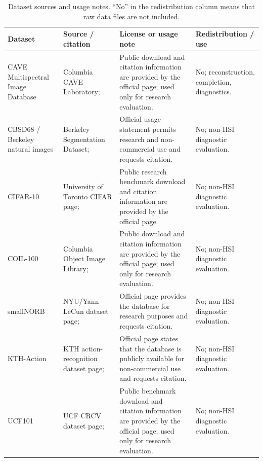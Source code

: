\begin{table}[!t]
  \centering
  \caption{Dataset sources and usage notes. ``No'' in the redistribution
  column means that raw data files are not included.}
  \label{tab:app-dataset-asset-usage}
  \scriptsize
  \renewcommand{\arraystretch}{1.10}
  \setlength{\tabcolsep}{3pt}
  \begin{tabular*}{\textwidth}{@{\extracolsep{\fill}}p{}p{}p{}p{}@{}}
  \toprule
  Dataset & Source / citation & License or usage note & Redistribution / use \\
  \midrule
  CAVE Multispectral Image Database &
  Columbia CAVE Laboratory; \cite{cave_multispectral_database,yasuma2010gapc} &
  Public download and citation information are provided by the official page;
  used only for research evaluation. &
  No; reconstruction, completion, diagnostics. \\
  CBSD68 / Berkeley natural images &
  Berkeley Segmentation Dataset; \cite{martin2001database} &
  Official usage statement permits research and non-commercial use and requests
  citation. &
  No; non-HSI diagnostic evaluation. \\
  CIFAR-10 &
  University of Toronto CIFAR page; \cite{krizhevsky2009learning} &
  Public research benchmark download and citation information are provided by
  the official page. &
  No; non-HSI diagnostic evaluation. \\
  COIL-100 &
  Columbia Object Image Library; \cite{nene1996coil100} &
  Public download and citation information are provided by the official page;
  used only for research evaluation. &
  No; non-HSI diagnostic evaluation. \\
  smallNORB &
  NYU/Yann LeCun dataset page; \cite{LeCun2004SmallNORB} &
  Official page provides the database for research purposes and requests
  citation. &
  No; non-HSI diagnostic evaluation. \\
  KTH-Action &
  KTH action-recognition dataset page; \cite{Schuldt2004KTHActions} &
  Official page states that the database is publicly available for
  non-commercial use and requests citation. &
  No; non-HSI diagnostic evaluation. \\
  UCF101 &
  UCF CRCV dataset page; \cite{Soomro2012UCF101} &
  Public benchmark download and citation information are provided by the
  official page; used only for research evaluation. &
  No; non-HSI diagnostic evaluation. \\
  \bottomrule
  \end{tabular*}
\end{table}
